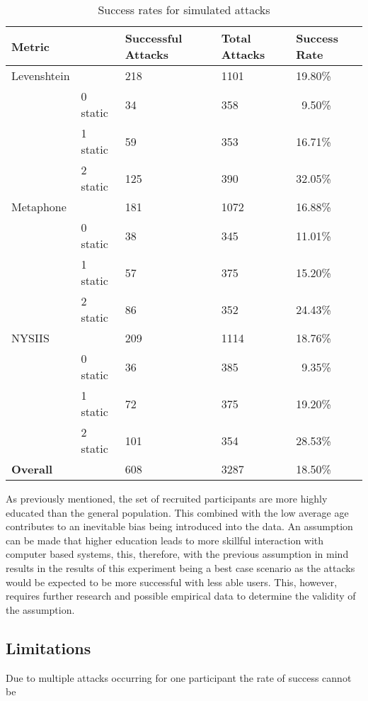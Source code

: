 \begin{table}
    \centering
    \begin{tabular}{|ll|l|l|l|}
        \hline
        \textbf{Metric} & & \textbf{Successful Attacks} & \textbf{Total Attacks} & \textbf{Success Rate} \\
        \hline
        Levenshtein && 218 & 1101 & 19.80\% \\
        \hline
        & 0 static   & 34  & 358  & ~9.50\% \\
        & 1 static   & 59  & 353  & 16.71\% \\
        & 2 static   & 125  & 390  & 32.05\% \\
        \hline\hline
        Metaphone &&  181 & 1072 & 16.88\% \\
        \hline
        & 0 static   & 38 & 345 & 11.01\% \\
        & 1 static   & 57 & 375 & 15.20\% \\
        & 2 static   & 86 & 352 & 24.43\% \\
        \hline\hline
        NYSIIS &&  209 & 1114 & 18.76\% \\
        \hline
        & 0 static   & 36 & 385 & ~9.35\% \\
        & 1 static   & 72 & 375 & 19.20\% \\
        & 2 static   & 101 & 354 & 28.53\% \\
        \hline\hline
        \textbf{Overall} & & 608 & 3287 & 18.50\% \\
        \hline\hline
    \end{tabular}
    \caption{Success rates for simulated attacks}
    \label{tab:exp2_attacks}
\end{table}

As previously mentioned, the set of recruited participants are more highly educated than the general population. This combined with the low average age contributes to an inevitable bias being introduced into the data. An assumption can be made that higher education leads to more skillful interaction with computer based systems, this, therefore, with the previous assumption in mind results in the results of this experiment being a best case scenario as the attacks would be expected to be more successful with less able users. This, however, requires further research and possible empirical data to determine the validity of the assumption.

\subsection*{Limitations}
Due to multiple attacks occurring for one participant the rate of success cannot be 


